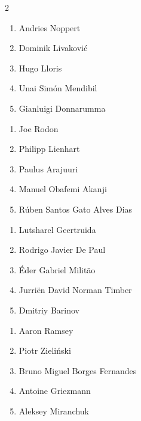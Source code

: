 \documentclass[11pt]{article}
\begin{document}
\begin{multicols}{2}

\begin{samepage}
\begin{tcolorbox}[evalbox,title=\textbf{Manuel Neuer (Goalkeeper)} \hfill Score:\ \rule{1cm}{0.4pt}]
\begin{enumerate}
\item Andries Noppert
\item Dominik Livaković
\item Hugo Lloris
\item Unai Simón Mendibil
\item Gianluigi Donnarumma
\end{enumerate}
\end{tcolorbox}
\end{samepage}

\begin{samepage}
\begin{tcolorbox}[evalbox,title=\textbf{Virgil van Dijk (Left Center Back)} \hfill Score:\ \rule{1cm}{0.4pt}]
\begin{enumerate}
\item Joe Rodon
\item Philipp Lienhart
\item Paulus Arajuuri
\item Manuel Obafemi Akanji
\item Rúben Santos Gato Alves Dias
\end{enumerate}
\end{tcolorbox}
\end{samepage}

\begin{samepage}
\begin{tcolorbox}[evalbox,title=\textbf{Trent Alexander-Arnold (Right Defensive Midfield)} \hfill Score:\ \rule{1cm}{0.4pt}]
\begin{enumerate}
\item Lutsharel Geertruida
\item Rodrigo Javier De Paul
\item Éder Gabriel Militão
\item Jurriën David Norman Timber
\item Dmitriy Barinov
\end{enumerate}
\end{tcolorbox}
\end{samepage}

\begin{samepage}
\begin{tcolorbox}[evalbox,title=\textbf{Kevin De Bruyne (Center Attacking Midfield)} \hfill Score:\ \rule{1cm}{0.4pt}]
\begin{enumerate}
\item Aaron Ramsey
\item Piotr Zieliński
\item Bruno Miguel Borges Fernandes
\item Antoine Griezmann
\item Aleksey Miranchuk
\end{enumerate}
\end{tcolorbox}
\end{samepage}


\end{multicols}
\end{document}
